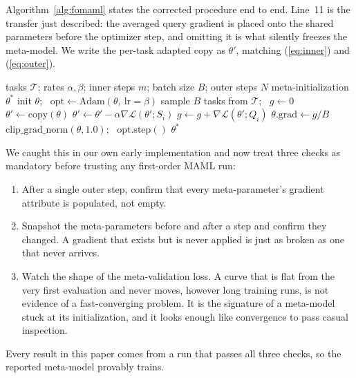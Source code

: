 \documentclass[conference]{IEEEtran}
\begin{document}
Algorithm~\ref{alg:fomaml} states the corrected procedure end to end.
Line~11 is the transfer just described: the averaged query gradient is
placed onto the shared parameters before the optimizer step, and omitting it
is what silently freezes the meta-model. We write the per-task adapted copy
as $\theta'$, matching (\ref{eq:inner}) and (\ref{eq:outer}).

\begin{algorithm}[t]
\caption{Corrected First-Order MAML Meta-Training}
\label{alg:fomaml}
\begin{algorithmic}[1]
\Require tasks $\mathcal{T}$; rates $\alpha,\beta$; inner steps $m$; batch
size $B$; outer steps $N$
\Ensure meta-initialization $\theta^{*}$
\State init $\theta$; \ $\mathrm{opt}\gets\mathrm{Adam}(\theta,\ \mathrm{lr}{=}\beta)$
  \State sample $B$ tasks from $\mathcal{T}$; \ $g\gets 0$
    \State $\theta'\gets\mathrm{copy}(\theta)$
      \State $\theta'\gets\theta'-\alpha\nabla\mathcal{L}(\theta';S_i)$
    \EndFor
    \State $g\gets g+\nabla\mathcal{L}(\theta';Q_i)$ 
  \EndFor
  \State $\theta.\mathrm{grad}\gets g/B$ 
  \State $\mathrm{clip\_grad\_norm}(\theta,1.0)$; \ $\mathrm{opt.step}()$
\EndFor
\State \Return $\theta^{*}$
\end{algorithmic}
\end{algorithm}

We caught this in our own early implementation and now treat three checks
as mandatory before trusting any first-order MAML run:
\begin{enumerate}
\item After a single outer step, confirm that every meta-parameter's
gradient attribute is populated, not empty.
\item Snapshot the meta-parameters before and after a step and confirm they
changed. A gradient that exists but is never applied is just as broken as
one that never arrives.
\item Watch the shape of the meta-validation loss. A curve that is flat from
the very first evaluation and never moves, however long training runs, is
not evidence of a fast-converging problem. It is the signature of a
meta-model stuck at its initialization, and it looks enough like
convergence to pass casual inspection.
\end{enumerate}
Every result in this paper comes from a run that passes all three checks,
so the reported meta-model provably trains.
\end{document}

